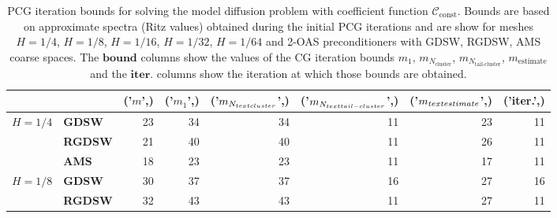\begin{table}[H]
\centering
\caption{PCG iteration bounds for solving the model diffusion problem with coefficient function $\mathcal{C}_{\mathrm{const}}$. Bounds are based on approximate spectra (Ritz values) obtained during the initial PCG iterations and are show for meshes $H=1/4$, $H=1/8$, $H=1/16$, $H=1/32$, $H=1/64$ and 2-OAS preconditioners with GDSW, RGDSW, AMS coarse spaces. The $\textbf{bound}$ columns show the values of the CG iteration bounds $m_1$, $m_{N_{\text{cluster}}}$, $m_{N_{\text{tail-cluster}}}$, $m_{\text{estimate}}$ and the $\textbf{iter.}$ columns show the iteration at which those bounds are obtained.}
\label{tab:cg_iteration_bound_coef=const}
\begin{tabular}{llrrrrrr}
\toprule
 &  & ('$m$',) & ('$m_1$',) & ('$m_{N_{\\text{cluster}}}$',) & ('$m_{N_{\\text{tail-cluster}}}$',) & ('$m_{\\text{estimate}}$',) & ('iter.',) \\
\midrule
\multirow[c]{3}{*}{\bfseries $H=1/4$} & \bfseries GDSW & 23 & {\cellcolor[HTML]{91A1F0}} \color[HTML]{F1F1F1} 34 & {\cellcolor[HTML]{91A1F0}} \color[HTML]{F1F1F1} 34 & {\cellcolor[HTML]{E2E4FB}} \color[HTML]{000000} 11 & {\cellcolor[HTML]{405FE5}} \color[HTML]{F1F1F1} 23 & 11 \\
\cline{2-8}
\bfseries  & \bfseries RGDSW & 21 & {\cellcolor[HTML]{E2E4FB}} \color[HTML]{000000} 40 & {\cellcolor[HTML]{E2E4FB}} \color[HTML]{000000} 40 & {\cellcolor[HTML]{91A1F0}} \color[HTML]{F1F1F1} 11 & {\cellcolor[HTML]{405FE5}} \color[HTML]{F1F1F1} 26 & 11 \\
\cline{2-8}
\bfseries  & \bfseries AMS & 18 & {\cellcolor[HTML]{91A1F0}} \color[HTML]{F1F1F1} 23 & {\cellcolor[HTML]{91A1F0}} \color[HTML]{F1F1F1} 23 & {\cellcolor[HTML]{E2E4FB}} \color[HTML]{000000} 11 & {\cellcolor[HTML]{405FE5}} \color[HTML]{F1F1F1} 17 & 11 \\
\cline{1-8} \cline{2-8}
\multirow[c]{3}{*}{\bfseries $H=1/8$} & \bfseries GDSW & 30 & {\cellcolor[HTML]{91A1F0}} \color[HTML]{F1F1F1} 37 & {\cellcolor[HTML]{91A1F0}} \color[HTML]{F1F1F1} 37 & {\cellcolor[HTML]{E2E4FB}} \color[HTML]{000000} 16 & {\cellcolor[HTML]{405FE5}} \color[HTML]{F1F1F1} 27 & 16 \\
\cline{2-8}
\bfseries  & \bfseries RGDSW & 32 & {\cellcolor[HTML]{91A1F0}} \color[HTML]{F1F1F1} 43 & {\cellcolor[HTML]{91A1F0}} \color[HTML]{F1F1F1} 43 & {\cellcolor[HTML]{E2E4FB}} \color[HTML]{000000} 11 & {\cellcolor[HTML]{405FE5}} \color[HTML]{F1F1F1} 27 & 11 \\

\end{tabular}
\end{table}
